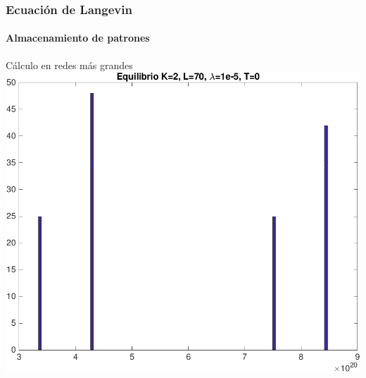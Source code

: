 \documentclass[11pt]{beamer}
\begin{document}
\begin{frame}
\frametitle{Ecuación de Langevin}
\framesubtitle{Almacenamiento de patrones}
\begin{center}
     Cálculo en redes más grandes\\
	\includegraphics[scale=0.3]{k2l70lambda5t0.png}
\end{center}

		

\end{frame}
\end{document}
